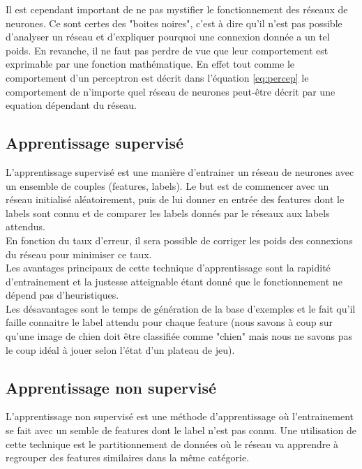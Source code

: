 \documentclass{article}
\begin{document}
 Il est cependant important de ne pas mystifier le fonctionnement des réseaux de neurones. Ce sont certes des "boites noires", c'est à dire qu'il n'est pas possible d'analyser un réseau et d'expliquer pourquoi une connexion donnée a un tel poids. En revanche, il ne faut pas perdre de vue que leur comportement est exprimable par une fonction mathématique. En effet tout comme le comportement d'un perceptron est décrit dans l'équation \ref{eq:percep} le comportement de n'importe quel réseau de neurones peut-être décrit par une equation dépendant du réseau.

\subsection{Apprentissage supervisé}

L'apprentissage supervisé est une manière d'entrainer un réseau de neurones avec un ensemble de couples (features, labels). Le but est de commencer avec un réseau initialisé aléatoirement, puis de lui donner en entrée des features dont le labels sont connu et de comparer les labels donnés par le réseaux aux labels attendus.\\
En fonction du taux d'erreur, il sera possible de corriger les poids des connexions du réseau pour minimiser ce taux.\cite{wikisupervised}\\

Les avantages principaux de cette technique d'apprentissage sont la rapidité d'entrainement et la justesse atteignable étant donné que le fonctionnement ne dépend pas d'heuristiques.\\

Les désavantages sont le temps de génération de la base d'exemples et le fait qu'il faille connaitre le label attendu pour chaque feature (nous savons à coup sur qu'une image de chien doit être classifiée comme "chien" mais nous ne savons pas le coup idéal à jouer selon l'état d'un plateau de jeu).

\subsection{Apprentissage non supervisé}

L'apprentissage non supervisé est une méthode d'apprentissage où l'entrainement se fait avec un semble de features dont le label n'est pas connu. Une utilisation de cette technique est le partitionnement de données où le réseau va apprendre à regrouper des features similaires dans la même catégorie.\cite{wikiunsupervised}\\
\end{document}
